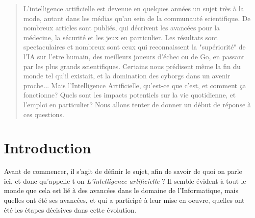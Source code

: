\documentclass[a0,landscape]{a0poster}
\begin{document}

\begin{multicols}{4} %


\color{RoyalBlue} %

\begin{abstract}

L'intelligence artificielle est devenue en quelques années un sujet très à la mode, autant dans les médias qu'au sein de la communauté scientifique.
De nombreux articles sont publiés, qui décrivent les avancées pour la médecine, la sécurité et les jeux en particulier.
Les résultats sont spectaculaires et nombreux sont ceux qui reconnaissent la "supériorité" de l'IA sur l'etre humain, des meilleurs joueurs d'échec ou de Go, en passant par les plus grands scientifiques.
Certains nous prédisent même la fin du monde tel qu'il existait, et la domination des cyborgs dans un avenir proche...
Mais l'Intelligence Artificielle, qu'est-ce que c'est, et comment ça fonctionne? Quels sont les impacts potentiels sur la vie quotidienne, et l'emploi en particulier? Nous allons tenter de donner un début de réponse à ces questions.

\end{abstract}


\color{IndianRed} %

\section*{Introduction}

Avant de commencer, il s'agit de définir le sujet, afin de savoir de quoi on parle ici, et donc qu'appelle-t-on \textit{L'intelligence artificielle} %
? 
Il semble évident à tout le monde que cela est lié à des avancées dans le domaine de l'Informatique, mais quelles ont été ses avancées, et qui a participé à leur mise en oeuvre, quelles ont été les étapes décisives dans cette évolution. 


\end{multicols}
\end{document}

